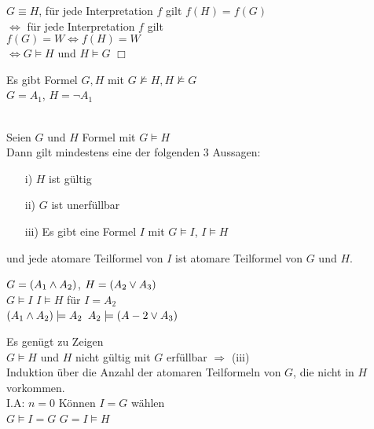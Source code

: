 \beweis{}
$G \equiv H$, für jede Interpretation $f$ gilt $f(H) = f(G)$\\
$\Leftrightarrow$ für jede Interpretation $f$ gilt\\
$f(G) = W \Leftrightarrow f(H) = W$\\
$\Leftrightarrow G \models H$ und $H \models G$ $\Box$

\beispiel{}
Es gibt Formel $G, H$ mit $G \not \models H, H \not \models G$\\
$G = A_1$, $H=\neg A_1$

 \textbf{}\\
Seien $G$ und $H$ Formel mit $G \models H$\\
Dann gilt mindestens eine der folgenden 3 Aussagen:
\begin{itemize}
\item[i)] $H$ ist gültig
\item[ii)] $G$ ist unerfüllbar
\item[iii)] Es gibt eine Formel $I$ mit $G \models I$, $I \models H$
\end{itemize}
und jede atomare Teilformel von $I$ ist atomare Teilformel von $G$ und $H$.

\beispiel{}
$G = (A_1 \wedge A_2)$, $H = (A_2 \vee A_3)$\\
$G \models I$ \hspace{1cm} $I \models H$ \hspace{1cm} für $I= A_2$\\
$(A_1 \wedge A_2) \models A_2$ \hspace{1cm} $A_2 \models (A-2 \vee A_3)$

\beweis{}
Es genügt zu Zeigen\\
$G \models H$ und $H$ nicht gültig mit $G$ erfüllbar $\Rightarrow$ (iii)\\

\noindent
Induktion über die Anzahl der atomaren Teilformeln von $G$, die nicht in $H$ vorkommen.\\
I.A: $n=0$ \hspace{1cm} Können $I = G$ wählen\\
$G \models I = G$ \hspace{1cm} $G = I \models H$\\

